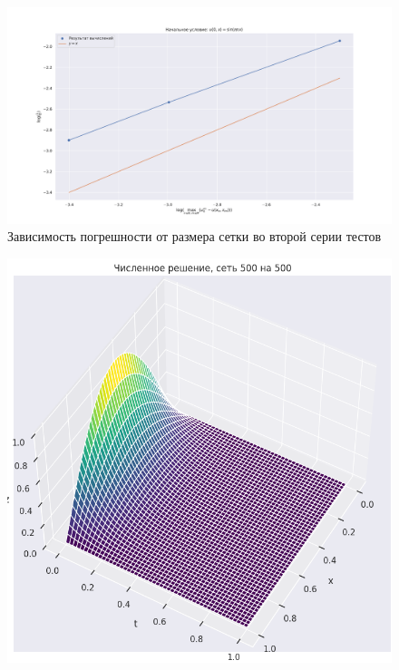 \documentclass[14pt,a4paper]{extarticle}
\newcommand{\1}{\mathbbm{1}}
\begin{document}
\begin{figure}
    \centering
    \includegraphics[scale=0.4]{figs/OrderCon2.pdf}
    \caption{Зависимость погрешности от размера сетки во второй серии тестов}
    \label{t2}
\end{figure}

\begin{figure}
    \centering
    \includegraphics[scale=0.6]{figs/p500500.png}
\end{figure}
\end{document}
